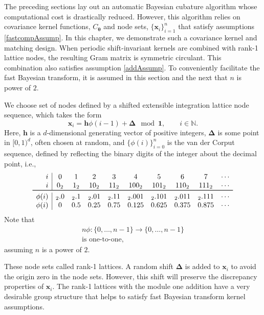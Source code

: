 \documentclass{iitthesis}          %
\newcommand{\bm}[1]{\boldsymbol{#1}}
\newcommand{\naturals}{\mathbb{N}}
\newcommand{\vDelta}{{\boldsymbol{\Delta}}}
\newcommand{\vtheta}{{\bm{\theta}}}
\newcommand{\vh}{\bm{h}}
\newcommand{\vx}{\bm{x}}
\newcommand{\vone}{\bm{1}}
\begin{document}
The preceding sections lay out an automatic Bayesian cubature algorithm whose computational cost is drastically reduced.  However, this algorithm relies on covariance kernel functions, $C_{\vtheta}$ and node sets, $\{\vx_i\}_{i=1}^n$ that satisfy assumptions \eqref{fastcompAssump}.  
In this chapter, we demonstrate such a covariance kernel and matching design.
When periodic shift-invariant kernels are combined with rank-1 lattice nodes, the resulting Gram matrix is symmetric circulant. 
This combination also satisfies assumption \eqref{addAssump}.  To conveniently facilitate the fast Bayesian transform, it is assumed in this section and the next that $n$ is power of $2$.  



We choose set of nodes defined by a shifted extensible integration lattice node sequence, which takes the form
\begin{equation}
\label{eqn:lattice_def}
\vx_{i} = \vh \phi(i-1) + \vDelta \mod \vone, \qquad i \in \naturals.
\end{equation} 
Here, $\vh$ is a $d$-dimensional generating vector of positive integers, $\vDelta$ is some point in $[0,1)^d$, often chosen at random, and $\{\phi(i)\}_{i=0}^n$ is the van der Corput sequence, defined by reflecting the binary digits of the integer about the decimal point, i.e., 
\begin{equation} \label{vdCDef}
\begin{array}{r|ccccccccccccc}
i & 0 & 1 & 2 & 3 & 4 &  5 & 6 & 7 & \cdots \\
i & 0_2 & 1_2 & 10_2 & 11_2 & 100_2 & 101_2 & 110_2 & 111_2  & \cdots\\
\toprule
\phi(i) & {}_2.0 &  {}_2.1 & {}_2.01 &  {}_2.11  & {}_2.001 &  {}_2.101 & {}_2.011 &  {}_2.111 & \cdots\\
\phi(i) & 0 &  0.5 &  0.25 & 0.75 &  0.125 & 0.625  &  0.375 & 0.875 & \cdots
\end{array}
\end{equation}
Note that 
\begin{multline} \label{phiprop}
n\phi:\{0, \ldots, n-1 \} \to \{0, \ldots, n-1\} \\
\text{is one-to-one},
\end{multline}
assuming $n$ is a power of $2$.

These node sets called rank-1 lattices.
A random shift  $\vDelta$ is added to $\vx_{i}$ to avoid the origin zero in the node sets. However, this shift will preserve the discrepancy properties of $\vx_{i}$. 
The rank-1 lattices with the module one addition have a very desirable group structure that helps to satisfy fast Bayesian transform kernel assumptions.
\end{document}
